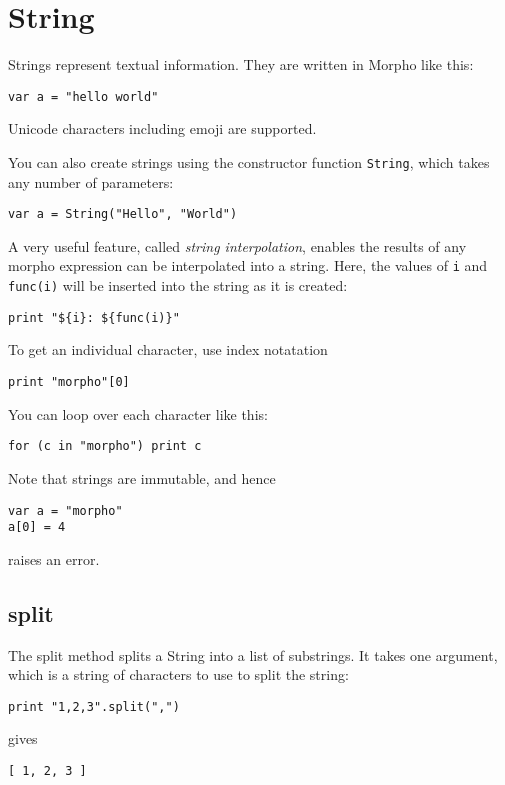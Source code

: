 \hypertarget{string}{%
\section{String}\label{string}}

Strings represent textual information. They are written in Morpho like
this:

\begin{lstlisting}
var a = "hello world"
\end{lstlisting}

Unicode characters including emoji are supported.

You can also create strings using the constructor function
\texttt{String}, which takes any number of parameters:

\begin{lstlisting}
var a = String("Hello", "World")
\end{lstlisting}

A very useful feature, called \emph{string interpolation}, enables the
results of any morpho expression can be interpolated into a string.
Here, the values of \texttt{i} and \texttt{func(i)} will be inserted
into the string as it is created:

\begin{lstlisting}
print "${i}: ${func(i)}"
\end{lstlisting}

To get an individual character, use index notatation

\begin{lstlisting}
print "morpho"[0]
\end{lstlisting}

You can loop over each character like this:

\begin{lstlisting}
for (c in "morpho") print c
\end{lstlisting}

Note that strings are immutable, and hence

\begin{lstlisting}
var a = "morpho"
a[0] = 4
\end{lstlisting}

raises an error.

\hypertarget{split}{%
\subsection{split}\label{split}}

The split method splits a String into a list of substrings. It takes one
argument, which is a string of characters to use to split the string:

\begin{lstlisting}
print "1,2,3".split(",")
\end{lstlisting}

gives

\begin{lstlisting}
[ 1, 2, 3 ]
\end{lstlisting}
